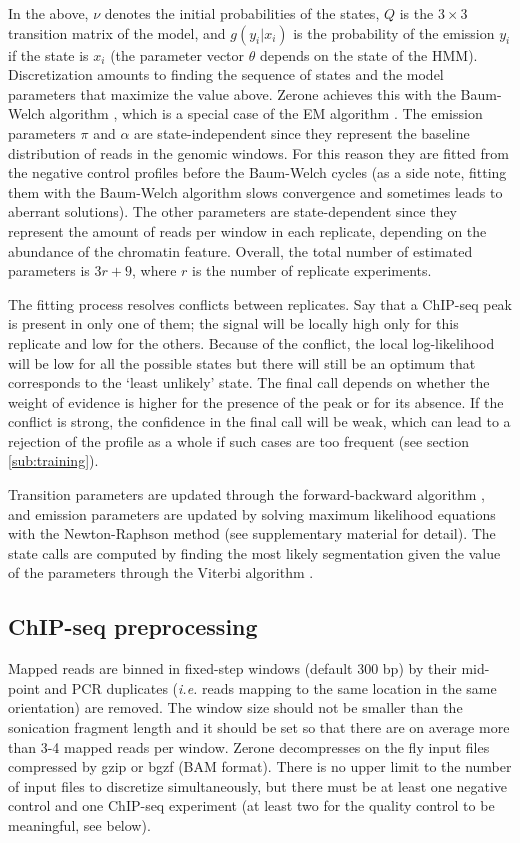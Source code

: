 \documentclass{bioinfo}
\begin{document}
\begin{methods}
In the above, $\nu$ denotes the initial probabilities of the states,
$Q$ is the $3 \times 3$ transition matrix of the model, and
$g(y_i|x_i)$ is the probability of the emission $y_i$ if the state is
$x_i$ (the parameter vector $\theta$ depends on the state of the HMM).
Discretization amounts to finding the sequence of states and the
model parameters that maximize the value above. Zerone achieves this
with the Baum-Welch algorithm \citep{baum1966}, which is a special case
of the EM algorithm \citep{Dempster77maximumlikelihood}. The emission
parameters $\pi$ and $\alpha$ are state-independent since they represent
the baseline distribution of reads in the genomic windows. For this
reason they are fitted from the negative control profiles before the
Baum-Welch cycles (as a side note, fitting them with the Baum-Welch
algorithm slows convergence and sometimes leads to
aberrant solutions). The other parameters
are state-dependent since they represent the amount of reads per window
in each replicate, depending on the abundance of the chromatin feature.
Overall, the total number of estimated parameters is $3r+9$, where $r$
is the number of replicate experiments.

The fitting process resolves conflicts between replicates. Say that
a ChIP-seq peak is present in only one of them; the signal
will be locally high only for this replicate and low for the others.
Because of the conflict, the local log-likelihood will be low for
all the possible states but there will still be an optimum that
corresponds to the `least unlikely' state. The final call depends on
whether the weight of evidence is higher for the presence of the
peak or for its absence. If the conflict is strong, the confidence
in the final call will be weak, which can lead to a rejection of
the profile as a whole if such cases are too frequent
(see section \ref{sub:training}).

Transition parameters are updated through the forward-backward
algorithm \citep{18626}, and emission parameters are updated by solving
maximum likelihood equations with the Newton-Raphson method (see
supplementary material for detail). The state calls are computed by
finding the most likely segmentation given the value of the parameters
through the Viterbi algorithm \citep{1054010}.

\subsection{ChIP-seq preprocessing}
Mapped reads are binned in fixed-step windows (default 300
bp) by their mid-point and PCR duplicates (\textit{i.e.} reads mapping to
the same location in the same orientation) are removed. The window size
should not be smaller than the sonication fragment length and
it should be set so that there are on average more than 3-4 mapped reads
per window. Zerone decompresses on the fly input files compressed by
gzip or bgzf (BAM format). There is
no upper limit to the number of input files to discretize simultaneously,
but there must be at least one negative control and one ChIP-seq
experiment (at least two for the quality control to be meaningful,
see below).


\end{methods}
\end{document}
